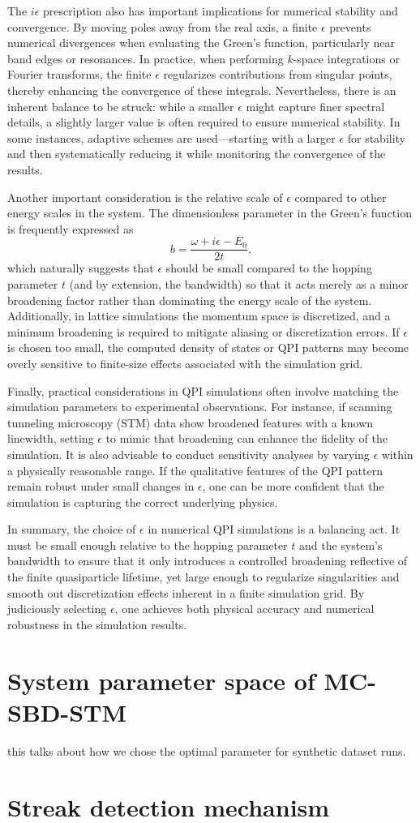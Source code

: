 The $i\epsilon$ prescription also has important implications for numerical stability and convergence. By moving poles away from the real axis, a finite $\epsilon$ prevents numerical divergences when evaluating the Green's function, particularly near band edges or resonances. In practice, when performing $k$-space integrations or Fourier transforms, the finite $\epsilon$ regularizes contributions from singular points, thereby enhancing the convergence of these integrals. Nevertheless, there is an inherent balance to be struck: while a smaller $\epsilon$ might capture finer spectral details, a slightly larger value is often required to ensure numerical stability. In some instances, adaptive schemes are used—starting with a larger $\epsilon$ for stability and then systematically reducing it while monitoring the convergence of the results.

Another important consideration is the relative scale of $\epsilon$ compared to other energy scales in the system. The dimensionless parameter in the Green’s function is frequently expressed as
\[
b = \frac{\omega + i\epsilon - E_0}{2t},
\]
which naturally suggests that $\epsilon$ should be small compared to the hopping parameter $t$ (and by extension, the bandwidth) so that it acts merely as a minor broadening factor rather than dominating the energy scale of the system. Additionally, in lattice simulations the momentum space is discretized, and a minimum broadening is required to mitigate aliasing or discretization errors. If $\epsilon$ is chosen too small, the computed density of states or QPI patterns may become overly sensitive to finite-size effects associated with the simulation grid.

Finally, practical considerations in QPI simulations often involve matching the simulation parameters to experimental observations. For instance, if scanning tunneling microscopy (STM) data show broadened features with a known linewidth, setting $\epsilon$ to mimic that broadening can enhance the fidelity of the simulation. It is also advisable to conduct sensitivity analyses by varying $\epsilon$ within a physically reasonable range. If the qualitative features of the QPI pattern remain robust under small changes in $\epsilon$, one can be more confident that the simulation is capturing the correct underlying physics.

In summary, the choice of $\epsilon$ in numerical QPI simulations is a balancing act. It must be small enough relative to the hopping parameter $t$ and the system's bandwidth to ensure that it only introduces a controlled broadening reflective of the finite quasiparticle lifetime, yet large enough to regularize singularities and smooth out discretization effects inherent in a finite simulation grid. By judiciously selecting $\epsilon$, one achieves both physical accuracy and numerical robustness in the simulation results.

\chapter{System parameter space of MC-SBD-STM}
this talks about how we chose the optimal parameter for synthetic dataset runs. 

\chapter{Streak detection mechanism}
